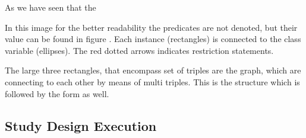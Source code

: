 
As we have seen that the 


In this image for the better readability the predicates are not denoted, but their value can be found in figure . Each instance (rectangles) is connected to the class variable (ellipses). The red dotted arrows indicates restriction statements.





The large three rectangles, that encompass set of triples are the graph, which are connecting to each other by means of multi triples. This is the structure which is followed by the form as well. 



\subsection{Study Design Execution}



